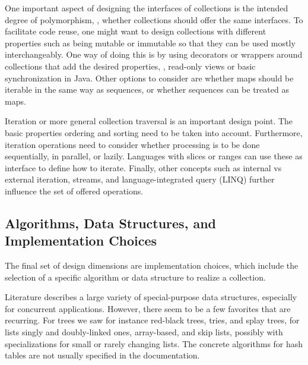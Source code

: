 \documentclass[sigconf, authorversion]{acmart}
\begin{document}

One important aspect of designing the interfaces of collections is the intended
degree of polymorphism,
\ie, whether collections should offer the same interfaces.
To facilitate code reuse, one might want to design collections
with different properties such as being mutable or immutable
so that they can be used mostly interchangeably.
One way of doing this is by using decorators or wrappers around collections
that add the desired properties, \eg, read-only views or basic synchronization in Java.
Other options to consider are whether maps should be iterable
in the same way as sequences, or whether sequences can be treated as maps.


Iteration or more general collection traversal is an important design point.
The basic properties ordering and sorting need to be taken into account.
Furthermore, iteration operations need to consider whether processing is
to be done sequentially, in parallel, or lazily.
Languages with slices or ranges can use these as interface
to define how to iterate.
Finally, other concepts such as internal vs external iteration, streams,
and language-integrated query (LINQ)
further influence the set of offered operations.

\subsection{Algorithms, Data Structures, and Implementation Choices}
\label{sec:impl-choices}

The final set of design dimensions are implementation choices,
which include the selection of a specific algorithm or data structure
to realize a collection.

Literature describes a large variety of special-purpose
data structures\citep{Pugh:1998:SkipList,Hinze:2006:Finger,Brodal:2013:PQ,Steindorfer:2015:OHM}, especially for concurrent applications\citep{Hendler:2004:SLS,1377094,1146165,InsertionTreePhasers,Prokopec:2018:CCL}.
However, there seem to be a few favorites that are recurring.
For
trees we saw for instance red-black trees, tries, and splay trees,
for lists singly and doubly-linked ones, array-based, and skip lists,
possibly with specializations for small or rarely changing lists.
%
The concrete algorithms for hash tables are not usually specified
in the documentation.
\end{document}
